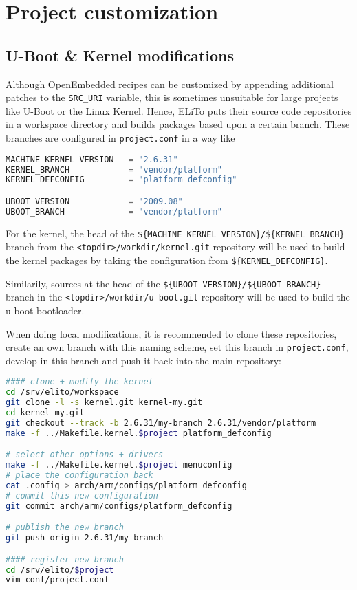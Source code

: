 \chapter{Project customization}
\label{chap:project-customization}

\section{U-Boot \& Kernel modifications}
\label{sec:project-customization_u-boot+kernel-modifications}

Although OpenEmbedded recipes can be customized by appending
additional patches to the \texttt{SRC\_URI} variable, this is
sometimes unsuitable for large projects like U-Boot or the Linux
Kernel.  Hence, ELiTo puts their source code repositories in a
workspace directory and builds packages based upon a certain
branch. These branches are configured in \texttt{project.conf} in a
way like

\begin{lstlisting}[language=python]
MACHINE_KERNEL_VERSION   = "2.6.31"
KERNEL_BRANCH            = "vendor/platform"
KERNEL_DEFCONFIG         = "platform_defconfig"

UBOOT_VERSION            = "2009.08"
UBOOT_BRANCH             = "vendor/platform"
\end{lstlisting}

For the kernel, the head of the
\texttt{\$\{MACHINE\_KERNEL\_VERSION\}/\$\{KERNEL\_BRANCH\}} branch
from the \texttt{<topdir>/workdir/kernel.git} repository will be used
to build the kernel packages by taking the configuration from
\texttt{\$\{KERNEL\_DEFCONFIG\}}.

Similarily, sources at the head of the
\texttt{\$\{UBOOT\_VERSION\}/\$\{UBOOT\_BRANCH\}} branch in the
\texttt{<topdir>/workdir/u-boot.git} repository will be used to
build the u-boot bootloader.

When doing local modifications, it is recommended to clone these
repositories, create an own branch with this naming scheme, set this
branch in \texttt{project.conf}, develop in this branch and push it
back into the main repository:

\begin{lstlisting}[language=sh]
#### clone + modify the kernel
cd /srv/elito/workspace
git clone -l -s kernel.git kernel-my.git
cd kernel-my.git
git checkout --track -b 2.6.31/my-branch 2.6.31/vendor/platform
make -f ../Makefile.kernel.$project platform_defconfig

# select other options + drivers
make -f ../Makefile.kernel.$project menuconfig
# place the configuration back
cat .config > arch/arm/configs/platform_defconfig
# commit this new configuration
git commit arch/arm/configs/platform_defconfig

# publish the new branch
git push origin 2.6.31/my-branch

#### register new branch
cd /srv/elito/$project
vim conf/project.conf
\end{lstlisting}

